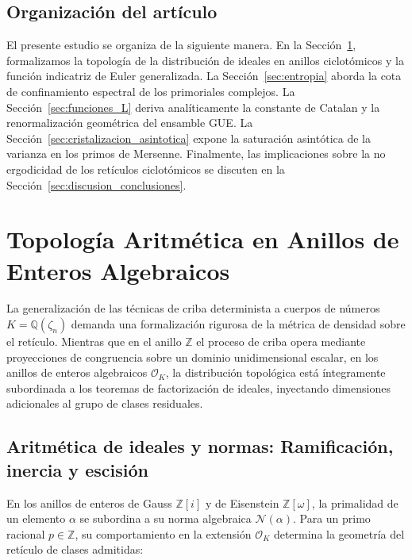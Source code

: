 \documentclass{article}
\numberwithin{equation}{section}
\theoremstyle{plain}
\theoremstyle{definition}
\begin{document}
\subsection*{Organización del artículo}

El presente estudio se organiza de la siguiente manera. En la Sección~\ref{sec:topologia}, formalizamos la topología de la distribución de ideales en anillos ciclotómicos y la función indicatriz de Euler generalizada. La Sección~\ref{sec:entropia} aborda la cota de confinamiento espectral de los primoriales complejos. La Sección~\ref{sec:funciones_L} deriva analíticamente la constante de Catalan y la renormalización geométrica del ensamble GUE. La Sección~\ref{sec:cristalizacion_asintotica} expone la saturación asintótica de la varianza en los primos de Mersenne. Finalmente, las implicaciones sobre la no ergodicidad de los retículos ciclotómicos se discuten en la Sección~\ref{sec:discusion_conclusiones}.

\section{Topología Aritmética en Anillos de Enteros Algebraicos}
\label{sec:topologia}

La generalización de las técnicas de criba determinista a cuerpos de números $K = \mathbb{Q}(\zeta_n)$ demanda una formalización rigurosa de la métrica de densidad sobre el retículo. Mientras que en el anillo $\mathbb{Z}$ el proceso de criba opera mediante proyecciones de congruencia sobre un dominio unidimensional escalar, en los anillos de enteros algebraicos $\mathcal{O}_K$, la distribución topológica está íntegramente subordinada a los teoremas de factorización de ideales, inyectando dimensiones adicionales al grupo de clases residuales.

\subsection{Aritmética de ideales y normas: Ramificación, inercia y escisión}

En los anillos de enteros de Gauss $\mathbb{Z}[i]$ y de Eisenstein $\mathbb{Z}[\omega]$, la primalidad de un elemento $\alpha$ se subordina a su norma algebraica $\mathcal{N}(\alpha)$. Para un primo racional $p \in \mathbb{Z}$, su comportamiento en la extensión $\mathcal{O}_K$ determina la geometría del retículo de clases admitidas:
\end{document}
